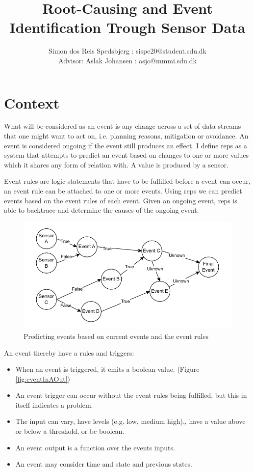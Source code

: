 \documentclass[a4paper,8pt]{article}
\title{Root-Causing and Event Identification Trough Sensor Data}
\author{Simon dos Reis Spedsbjerg : sispe20@student.sdu.dk\\ {\small Advisor: Aslak Johansen : asjo@mmmi.sdu.dk}}
\begin{document}
	\maketitle
	\section{Context}
		What will be considered as an event is any change across a set of data streams that one might want to act on, i.e. planning reasons, mitigation or avoidance. An event is considered ongoing if the event still produces an effect.
		I define \gls{reps} as a system that attempts to predict an event based on changes to one or more values which it shares any form of relation with. A value is produced by a sensor. 
		
		Event rules are logic statements that have to be fulfilled before a event can occur, an event rule can be attached to one or more events.
		Using \gls{reps} we can predict events based on the event rules of each event. Given an ongoing event, \gls{reps} is able to backtrace and determine the causes of the ongoing event.
		\begin{figure}[!h]
			\centering
			\includegraphics[width=.9\textwidth]{Events}
			\caption{Predicting events based on current events and the event rules}
			\label{fig:prediction}
		\end{figure}
		\newpage
		An event thereby have a rules and triggers:
		\begin{itemize}
			\item When an event is triggered, it emits a boolean value. (Figure \ref{fig:eventInAOut})
			\item An event trigger can occur without the event rules being fulfilled, but this in itself indicates a problem.
			\item The input can vary, have levels (e.g. low, medium high),, have a value above or below a threshold, or be boolean.
			\item An event output is a function over the events inputs. %
			\item An event may consider time and state and previous states.
		\end{itemize}
		
\end{document}
